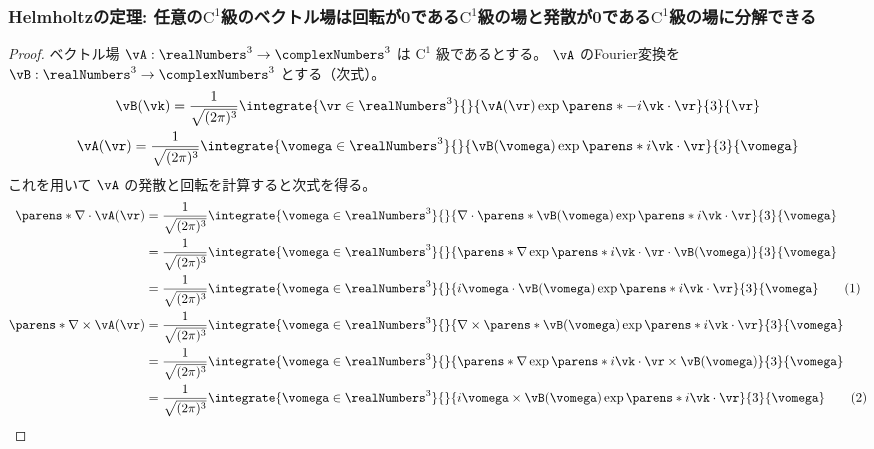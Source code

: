             \subsubsection{Helmholtzの定理: 任意の\texorpdfstring{$\mathrm{C}^1$}{C\string^1}級のベクトル場は回転が\texorpdfstring{$\bm{0}$}{0}である\texorpdfstring{$\mathrm{C}^1$}{C\string^1}級の場と発散が0である\texorpdfstring{$\mathrm{C}^1$}{C\string^1}級の場に分解できる}
            \begin{proof}
                \quad\par
                ベクトル場 $\vA:\realNumbers^3\to\complexNumbers^3$ は $\mathrm{C}^1$ 級であるとする。
                $\vA$ のFourier変換を $\vB:\realNumbers^3\to\complexNumbers^3$ とする（次式）。
                \begin{gather*}
                    \vB(\vk) = \frac{1}{\sqrt{(2\pi)^3}}\integrate{\vr\in\realNumbers^3}{}{\vA(\vr)\exp\parens*{-i\vk\cdot\vr}}{3}{\vr} \\
                    \vA(\vr) = \frac{1}{\sqrt{(2\pi)^3}}\integrate{\vomega\in\realNumbers^3}{}{\vB(\vomega)\exp\parens*{i\vk\cdot\vr}}{3}{\vomega}
                \end{gather*}
                これを用いて $\vA$ の発散と回転を計算すると次式を得る。
                \begin{align*}
                    \parens*{\nabla\cdot\vA}(\vr) &= \frac{1}{\sqrt{(2\pi)^3}}\integrate{\vomega\in\realNumbers^3}{}{\nabla\cdot\parens*{\vB(\vomega)\exp\parens*{i\vk\cdot\vr}}}{3}{\vomega} \\
                    &= \frac{1}{\sqrt{(2\pi)^3}}\integrate{\vomega\in\realNumbers^3}{}{\parens*{\nabla\exp\parens*{i\vk\cdot\vr}}\cdot\vB(\vomega)}{3}{\vomega} \\
                    &= \frac{1}{\sqrt{(2\pi)^3}}\integrate{\vomega\in\realNumbers^3}{}{i\vomega\cdot\vB(\vomega)\exp\parens*{i\vk\cdot\vr}}{3}{\vomega} \tag{1} \\
                    \parens*{\nabla\times\vA}(\vr) &= \frac{1}{\sqrt{(2\pi)^3}}\integrate{\vomega\in\realNumbers^3}{}{\nabla\times\parens*{\vB(\vomega)\exp\parens*{i\vk\cdot\vr}}}{3}{\vomega} \\
                    &= \frac{1}{\sqrt{(2\pi)^3}}\integrate{\vomega\in\realNumbers^3}{}{\parens*{\nabla\exp\parens*{i\vk\cdot\vr}}\times\vB(\vomega)}{3}{\vomega} \\
                    &= \frac{1}{\sqrt{(2\pi)^3}}\integrate{\vomega\in\realNumbers^3}{}{i\vomega\times\vB(\vomega)\exp\parens*{i\vk\cdot\vr}}{3}{\vomega} \tag{2}

\end{align*}
\end{proof}
